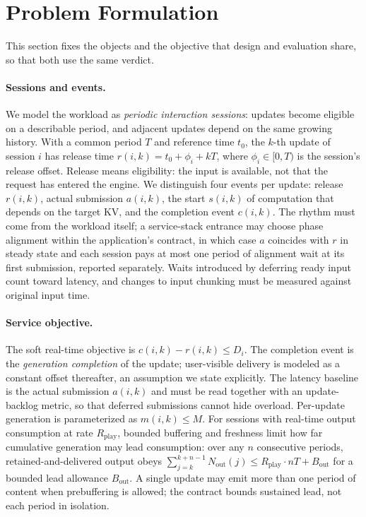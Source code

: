 \section{Problem Formulation}
\label{sec:formulation}


This section fixes the objects and the objective that design and evaluation
share, so that both use the same verdict.

\paragraph{Sessions and events.}
We model the workload as \emph{periodic interaction sessions}: updates become
eligible on a describable period, and adjacent updates depend on the same
growing history. With a common period $T$ and reference time $t_0$, the $k$-th
update of session $i$ has release time $r(i,k) = t_0 + \phi_i + kT$, where
$\phi_i \in [0, T)$ is the session's release offset. Release means eligibility:
the input is available, not that the request has entered the engine. We
distinguish four events per update: release $r(i,k)$, actual submission
$a(i,k)$, the start $s(i,k)$ of computation that depends on the target KV, and
the completion event $c(i,k)$. The rhythm must come from the workload itself;
a service-stack entrance may choose phase alignment within the application's
contract, in which case $a$ coincides with $r$ in steady state and each
session pays at most one period of alignment wait at its first submission,
reported separately. Waits introduced by deferring ready input count toward
latency, and changes to input chunking must be measured against original input
time.

\paragraph{Service objective.}
The soft real-time objective is $c(i,k) - r(i,k) \le D_i$. The completion
event is the \emph{generation completion} of the update; user-visible delivery
is modeled as a constant offset thereafter, an assumption we state explicitly.
The latency baseline is the actual submission $a(i,k)$ and must be read
together with an update-backlog metric, so that deferred submissions cannot
hide overload. Per-update generation is parameterized as $m(i,k) \le M$. For
sessions with real-time output consumption at rate $R_{\mathrm{play}}$,
bounded buffering and freshness limit how far cumulative generation may lead
consumption: over any $n$ consecutive periods, retained-and-delivered output
obeys $\sum_{j=k}^{k+n-1} N_{\mathrm{out}}(j) \le R_{\mathrm{play}} \cdot nT +
B_{\mathrm{out}}$ for a bounded lead allowance $B_{\mathrm{out}}$. A single
update may emit more than one period of content when prebuffering is allowed;
the contract bounds sustained lead, not each period in isolation.

